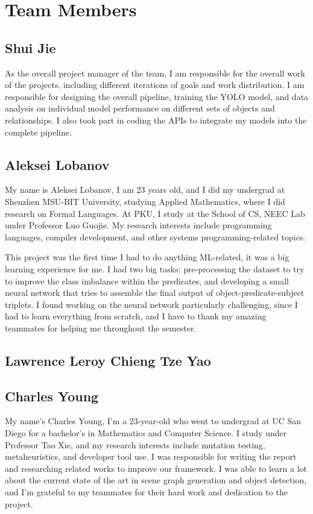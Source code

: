\documentclass{article}
\begin{document}
\section{Team Members}
\subsection*{Shui Jie}
 As the overall project manager of the team, I am responsible for the overall work of the projects, including different iterations of goals and work distribution. I am responsible for designing the overall pipeline, training the YOLO model, and data analysis on individual model performance on different sets of objects and relationships. I also took part in coding the APIs to integrate my models into the complete pipeline.
\subsection*{Aleksei Lobanov}
My name is Aleksei Lobanov, I am 23 years old, and I did my undergrad at Shenzhen MSU-BIT University, studying Applied Mathematics, where I did research on Formal Languages. At PKU, I study at the School of CS, NEEC Lab under Professor Luo Guojie. My research interests include programming languages, compiler development, and other systems programming-related topics. 

This project was the first time I had to do anything ML-related, it was a big learning experience for me. I had two big tasks: pre-processing the dataset to try to improve the class imbalance within the predicates, and developing a small neural network that tries to assemble the final output of object-predicate-subject triplets. I found working on the neural network particularly challenging, since I had to learn everything from scratch, and I have to thank my amazing teammates for helping me throughout the semester.
\subsection*{Lawrence Leroy Chieng Tze Yao}
\subsection*{Charles Young}
My name's Charles Young, I'm a 23-year-old who went to undergrad at UC San Diego for a bachelor's in Mathematics and Computer Science. I study under Professor Tao Xie, and my research interests include mutation testing, metaheuristics, and developer tool use. I was responsible for writing the report and researching related works to improve our framework. I was able to learn a lot about the current state of the art in scene graph generation and object detection, and I'm grateful to my teammates for their hard work and dedication to the project.
\end{document}
